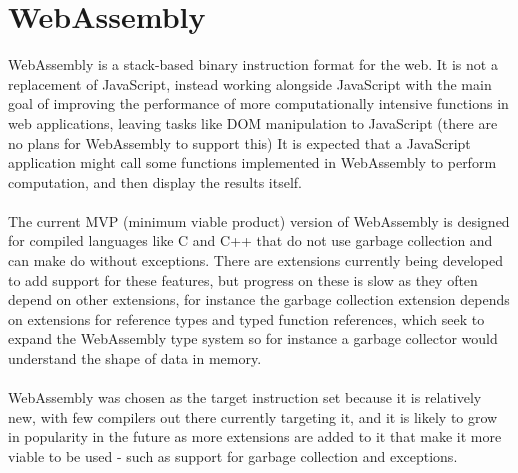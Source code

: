 \section{WebAssembly}
WebAssembly\cite{webassembly} is a stack-based binary instruction format for the web. It is not a replacement of JavaScript, instead working alongside JavaScript with the main goal of improving the performance of  more computationally intensive functions in web applications, leaving tasks like DOM manipulation to JavaScript (there are no plans for WebAssembly to support this) It  is  expected  that  a  JavaScript  application might  call  some  functions  implemented  in  WebAssembly  to  perform  computation,  and then display the results itself.
\\\\
The current MVP (minimum viable product) version of WebAssembly is designed for compiled languages like C and C++ that do not use garbage collection and can make do without exceptions. There are extensions currently being developed to add support for these features, but progress on these is slow as they often depend on other extensions, for instance the garbage collection extension depends on extensions for reference types and typed function references, which seek to expand the WebAssembly type system so for instance a garbage collector would understand the shape of data in memory\cite{Wgce}.
\\\\
WebAssembly was chosen as the target instruction set because it is relatively new, with few compilers out there currently targeting it, and it is likely to grow in popularity in the future as more extensions are added to it that make it more viable to be used - such as support for garbage collection and exceptions.


